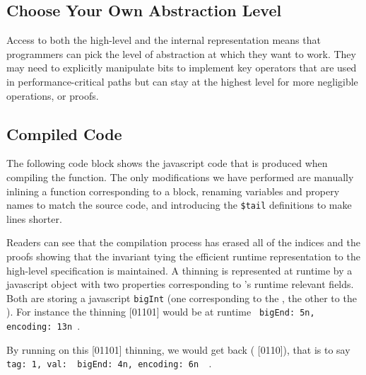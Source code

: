 
\subsection{Choose Your Own Abstraction Level}

Access to both the high-level  and the internal 
representation means that programmers can pick the level of abstraction at which they
want to work.
%
They may need to explicitly manipulate bits to implement key operators that are used
in performance-critical paths but can stay at the highest level for more negligible
operations, or proofs.


\subsection{Compiled Code}

The following code block shows the javascript code that is produced when compiling the
 function.
%
The only modifications we have performed are manually inlining a function
corresponding to a  block, renaming variables and propery names
to match the source code, and introducing the \texttt{\$tail} definitions to make
lines shorter.



Readers can see that the compilation process has erased all of the indices
and the proofs
showing that the invariant tying the efficient runtime representation to the
high-level specification is maintained.
%
A thinning is represented at runtime by a javascript object with two properties
corresponding to 's runtime relevant fields. Both are storing a
javascript \texttt{bigInt} (one corresponding to the , the other
to the ).
%
For instance the thinning [01101] would be at runtime
\texttt{{ bigEnd: 5n, encoding: 13n }}.
%

By running  on this [01101] thinning, we would get
back ( [0110]), that is to say
\texttt{{ tag: 1, val: { bigEnd: 4n, encoding: 6n } }}.
